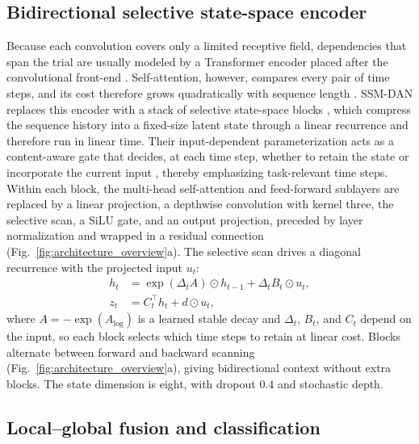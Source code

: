\documentclass[preprint,12pt]{elsarticle}
\begin{document}
\subsection{Bidirectional selective state-space encoder}
\label{subsec:ssm}

Because each convolution covers only a limited receptive field, dependencies that span the trial are usually modeled by a Transformer encoder placed after the convolutional front-end \cite{song2023eegconformer,altaheri2025tcformer}. Self-attention, however, compares every pair of time steps, and its cost therefore grows quadratically with sequence length \cite{vaswani2017attention}. SSM-DAN replaces this encoder with a stack of selective state-space blocks \cite{gu2022s4,gu2024mamba}, which compress the sequence history into a fixed-size latent state through a linear recurrence and therefore run in linear time. Their input-dependent parameterization acts as a content-aware gate that decides, at each time step, whether to retain the state or incorporate the current input \cite{gu2024mamba}, thereby emphasizing task-relevant time steps. Within each block, the multi-head self-attention and feed-forward sublayers are replaced by a linear projection, a depthwise convolution with kernel three, the selective scan, a SiLU gate, and an output projection, preceded by layer normalization and wrapped in a residual connection (Fig.~\ref{fig:architecture_overview}a). The selective scan drives a diagonal recurrence with the projected input $u_t$:
\begin{align}
    h_t &= \exp(\Delta_t A)\odot h_{t-1} + \Delta_t B_t\odot u_t, \\
    z_t &= C_t^\top h_t + d\odot u_t ,
\end{align}
where $A=-\exp(A_{\log})$ is a learned stable decay and $\Delta_t$, $B_t$, and $C_t$ depend on the input, so each block selects which time steps to retain at linear cost. Blocks alternate between forward and backward scanning (Fig.~\ref{fig:architecture_overview}a), giving bidirectional context without extra blocks. The state dimension is eight, with dropout 0.4 and stochastic depth.

\subsection{Local--global fusion and classification}
\label{subsec:tcn}
\end{document}
